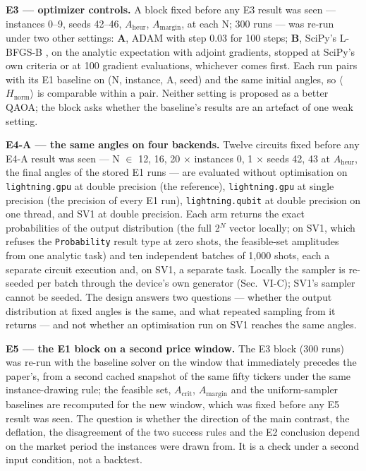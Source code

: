 \documentclass{ieeeaccess}
\begin{document}
\textbf{E3 --- optimizer controls.} A block fixed before any E3 result was seen --- instances 0--9, seeds 42--46, {$A_{\mathrm{heur}}$, $A_{\mathrm{margin}}$}, at each N; 300 runs --- was re-run under two other settings: \textbf{A}, ADAM with step 0.03 for 100 steps; \textbf{B}, SciPy's L-BFGS-B \cite{ref43}, \cite{ref44} on the analytic expectation with adjoint gradients, stopped at SciPy's own criteria or at 100 gradient evaluations, whichever comes first. Each run pairs with its E1 baseline on (N, instance, A, seed) and the same initial angles, so $\langle$$H_{\mathrm{norm}}$$\rangle$ is comparable within a pair. Neither setting is proposed as a better QAOA; the block asks whether the baseline's results are an artefact of one weak setting.


\textbf{E4-A --- the same angles on four backends.} Twelve circuits fixed before any E4-A result was seen --- N $\in$ {12, 16, 20} $\times$ instances {0, 1} $\times$ seeds {42, 43} at $A_{\mathrm{heur}}$, the final angles of the stored E1 runs --- are evaluated without optimisation on \texttt{lightning.gpu} at double precision (the reference), \texttt{lightning.gpu} at single precision (the precision of every E1 run), \texttt{lightning.qubit} at double precision on one thread, and SV1 at double precision. Each arm returns the exact probabilities of the output distribution (the full 2$^{N}$ vector locally; on SV1, which refuses the \texttt{Probability} result type at zero shots, the feasible-set amplitudes from one analytic task) and ten independent batches of 1,000 shots, each a separate circuit execution and, on SV1, a separate task. Locally the sampler is re-seeded per batch through the device's own generator (Sec.~VI-C); SV1's sampler cannot be seeded. The design answers two questions --- whether the output distribution at fixed angles is the same, and what repeated sampling from it returns --- and not whether an optimisation run on SV1 reaches the same angles.


\textbf{E5 --- the E1 block on a second price window.} The E3 block (300 runs) was re-run with the baseline solver on the window that immediately precedes the paper's, from a second cached snapshot of the same fifty tickers under the same instance-drawing rule; the feasible set, $A_{\mathrm{crit}}$, $A_{\mathrm{margin}}$ and the uniform-sampler baselines are recomputed for the new window, which was fixed before any E5 result was seen. The question is whether the direction of the main contrast, the deflation, the disagreement of the two success rules and the E2 conclusion depend on the market period the instances were drawn from. It is a check under a second input condition, not a backtest.
\end{document}
